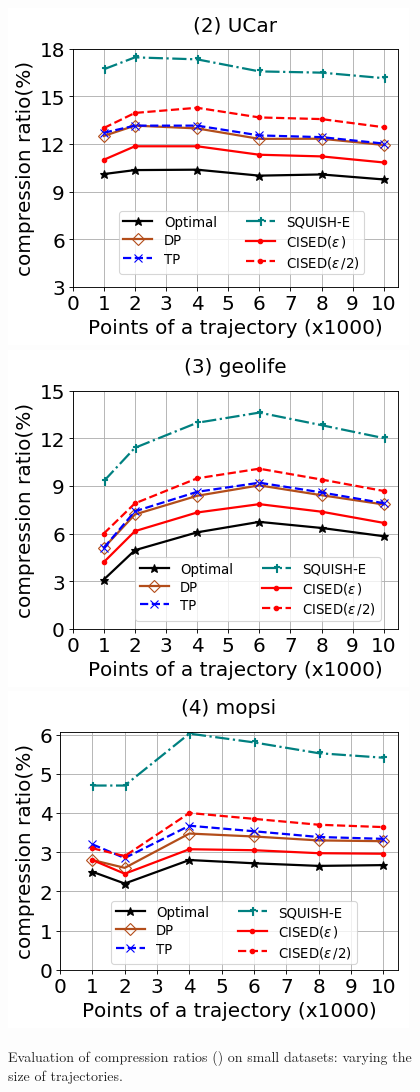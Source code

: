 \begin{figure}[tb!]
	\centering
	\includegraphics[scale=0.320]{Figures/Exp-SED-CR-size-service.png} 	\hspace{3ex}
	\includegraphics[scale=0.320]{Figures/Exp-SED-CR-size-geolife.png}	\hspace{3ex}
	\includegraphics[scale=0.320]{Figures/Exp-SED-CR-size-mopsi.png}		
	\vspace{-2ex}
	
	\caption{\small Evaluation of compression ratios (\sed) on small datasets: varying the size of
		trajectories.}
	\label{fig:cr-sed-size}
	\vspace{-2ex}
\end{figure}

